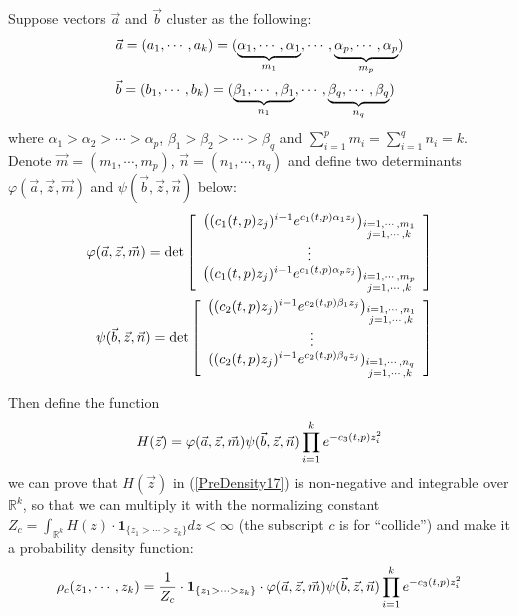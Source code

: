 Suppose vectors $\vec{a}$ and $\vec{b}$ cluster as the following:
\begin{equation}{\label{Block}}
\begin{split}
	&\vec{a}=(a_{1},\cdots,a_{k})=(\underbrace{\alpha_{1},\cdots,\alpha_{1}}_{m_{1}},\cdots,\underbrace{\alpha_{p},\cdots,\alpha_{p}}_{m_{p}})\\
	&\vec{b}=(b_{1},\cdots,b_{k})=(\underbrace{\beta_{1},\cdots,\beta_{1}}_{n_{1}},\cdots,\underbrace{\beta_{q},\cdots,\beta_{q}}_{n_{q}})
\end{split}
\end{equation}
where $\alpha_{1}>\alpha_{2}>\cdots>\alpha_{p}$, $\beta_{1}>\beta_{2}>\cdots>\beta_{q}$ and $\sum_{i=1}^{p}m_{i}=\sum_{i=1}^{q}n_{i}=k$. Denote $\vec{m}=(m_{1},\cdots,m_{p})$, $\vec{n}=(n_{1},\cdots,n_{q})$ and define two determinants $\varphi(\vec{a},\vec{z},\vec{m})$ and $\psi(\vec{b},\vec{z},\vec{n})$ below:
\begin{equation}{\label{TwoDet}}
\begin{split}
	\varphi(\vec{a},\vec{z},\vec{m})= \det
	\left[ \begin{array}{ccc}
		\left((c_{1}(t,p)z_{j})^{i-1}e^{c_{1}(t,p)\alpha_{1}z_{j}}\right)_{\substack{i=1,\cdots,m_{1}\\j=1,\cdots,k}}\\
	\vdots\\
	\left((c_{1}(t,p)z_{j})^{i-1}e^{c_{1}(t,p)\alpha_{p}z_{j}}\right)_{\substack{i=1,\cdots,m_{p} \\j=1,\cdots,k}}
	\end{array}
	\right]
\\
	\psi(\vec{b},\vec{z},\vec{n})= \det
	\left[ \begin{array}{ccc}
		\left((c_{2}(t,p)z_{j})^{i-1}e^{c_{2}(t,p)\beta_{1}z_{j}}\right)_{\substack{i=1,\cdots,n_{1}\\j=1,\cdots,k}}\\
	\vdots\\
	((c_{2}(t,p)z_{j})^{i-1}e^{c_{2}(t,p)\beta_{q}z_{j}})_{\substack{i=1,\cdots, n_{q} \\j=1,\cdots,k}}
	\end{array}
	\right]
\end{split}
\end{equation}

Then define the function 
\begin{align}{\label{PreDensity17}}
	H(\vec{z})=\varphi(\vec{a},\vec{z},\vec{m})\psi(\vec{b},\vec{z},\vec{n})\prod_{i=1}^{k}e^{-c_{3}(t,p)z_{i}^{2}}
\end{align}
we can prove that $H(\vec{z})$ in (\ref{PreDensity17}) is non-negative and integrable over $\mathbb{R}^{k}$, so that we can multiply it with the normalizing constant $Z_{c}=\int_{\mathbb{R}^{k}}H(z)\cdot\mathbf{1}_{\{z_1>\cdots>z_{k}\}}dz<\infty$ (the subscript $c$ is for ``collide'') and make it a probability density function:
\begin{align}{\label{Density17}}
\rho_{c}(z_{1},\cdots,z_{k})=\frac{1}{Z_{c}}\cdot\mathbf{1}_{\{z_{1}>\cdots> z_{k}\}}\cdot \varphi(\vec{a},\vec{z},\vec{m})\psi(\vec{b},\vec{z},\vec{n})\prod_{i=1}^{k}e^{-c_{3}(t,p)z_{i}^{2}}	
\end{align}

